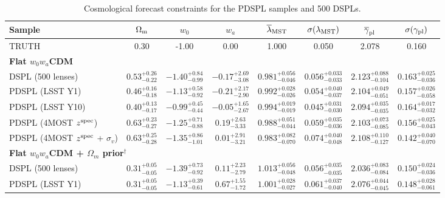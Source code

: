 \documentclass[a4paper,11pt]{article}
\begin{document}
\begin{table}
\centering
\begin{threeparttable}
\caption{Cosmological forecast constraints for the PDSPL samples and 500 DSPLs.}\label{tab:forecast_results}
\vspace{1em}
\begin{tabular}{lccccccc}
\toprule
Sample & $\Omega_{\rm m}$ & $w_0$ & $w_a$ & $\overline\lambda_{\rm MST}$ & $\sigma(\lambda_{\rm MST})$ & $\overline\gamma_{\rm pl}$ & $\sigma(\gamma_{\rm pl})$ \\
\midrule
TRUTH & 0.30 & -1.00 & 0.00 & 1.000 & 0.050 & 2.078 & 0.160 \\
\midrule
\multicolumn{8}{l}{\textbf{Flat $w_0w_a$CDM}} \\
\midrule
DSPL (500 lenses) & $0.53^{+0.26}_{-0.22}$ & $-1.40^{+0.84}_{-0.99}$ & $-0.17^{+2.69}_{-3.08}$ & $0.981^{+0.056}_{-0.046}$ & $0.056^{+0.033}_{-0.033}$ & $2.123^{+0.088}_{-0.104}$ & $0.163^{+0.025}_{-0.036}$ \\
PDSPL (LSST Y1) & $0.46^{+0.16}_{-0.18}$ & $-1.13^{+0.58}_{-0.92}$ & $-0.21^{+2.17}_{-2.90}$ & $0.992^{+0.028}_{-0.026}$ & $0.054^{+0.040}_{-0.037}$ & $2.104^{+0.049}_{-0.051}$ & $0.157^{+0.026}_{-0.058}$ \\
PDSPL (LSST Y10) & $0.40^{+0.13}_{-0.17}$ & $-0.99^{+0.45}_{-0.44}$ & $-0.05^{+1.65}_{-2.67}$ & $0.994^{+0.019}_{-0.019}$ & $0.045^{+0.031}_{-0.030}$ & $2.094^{+0.035}_{-0.035}$ & $0.164^{+0.017}_{-0.032}$ \\
PDSPL (4MOST $z^{\rm spec}$) & $0.63^{+0.23}_{-0.27}$ & $-1.25^{+0.71}_{-0.88}$ & $0.19^{+2.63}_{-3.33}$ & $0.988^{+0.051}_{-0.044}$ & $0.059^{+0.035}_{-0.036}$ & $2.103^{+0.073}_{-0.085}$ & $0.156^{+0.025}_{-0.043}$ \\
PDSPL (4MOST $z^{\rm spec}$ + $\sigma_v$) & $0.63^{+0.25}_{-0.28}$ & $-1.35^{+0.86}_{-1.01}$ & $0.01^{+2.91}_{-3.21}$ & $0.983^{+0.082}_{-0.070}$ & $0.074^{+0.040}_{-0.048}$ & $2.108^{+0.110}_{-0.127}$ & $0.142^{+0.040}_{-0.070}$ \\
\midrule
\multicolumn{8}{l}{\textbf{Flat $w_0w_a$CDM + $\Omega_{m}$ prior$^\dagger$}} \\
\midrule
DSPL (500 lenses) & $0.31^{+0.05}_{-0.05}$ & $-1.39^{+0.73}_{-0.92}$ & $0.11^{+2.23}_{-2.79}$ & $1.013^{+0.056}_{-0.048}$ & $0.056^{+0.035}_{-0.035}$ & $2.036^{+0.083}_{-0.084}$ & $0.150^{+0.024}_{-0.036}$ \\
PDSPL (LSST Y1) & $0.31^{+0.05}_{-0.05}$ & $-1.13^{+0.39}_{-0.61}$ & $0.67^{+1.55}_{-1.72}$ & $1.001^{+0.028}_{-0.027}$ & $0.061^{+0.037}_{-0.040}$ & $2.076^{+0.044}_{-0.045}$ & $0.148^{+0.028}_{-0.061}$ \\

\end{tabular}
\end{threeparttable}
\end{table}
\end{document}
